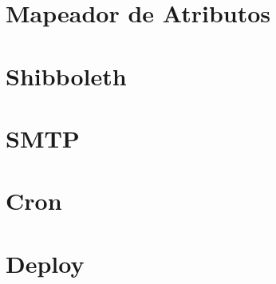 \documentclass{packages/labsec_planos}
\begin{document}
\chapter{Mapeador de Atributos}


\chapter{Shibboleth}


\chapter{SMTP}


\chapter{Cron}


\chapter{Deploy}

\end{document}
